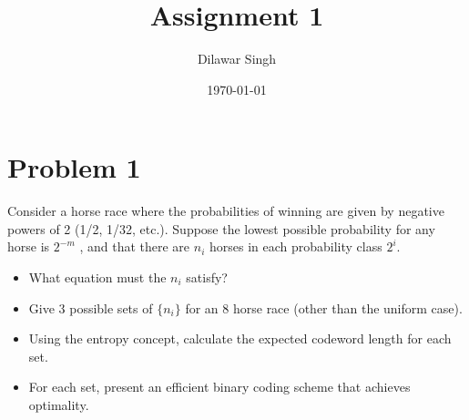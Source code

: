 \documentclass[a4paper,10pt]{article}
\title{Assignment 1}
\author{Dilawar Singh}
\date{\today}
\begin{document}
\maketitle


\section{Problem 1}

Consider a horse race where the probabilities of winning are given by negative
powers of 2 (1/2, 1/32, etc.). Suppose the lowest possible probability for any
horse is $2^{-m}$ , and that there are $n_i$ horses in each probability class $2^i$.

\begin{itemize}
    \item What equation must the $n_i$ satisfy?  
    \item Give 3 possible sets of $\{n_i\}$ for an 8 horse race (other than the
        uniform case).
    \item Using the entropy concept, calculate the expected codeword length for
        each set.
    \item For each set, present an efficient binary coding scheme that achieves
        optimality.
\end{itemize}
\end{document}
